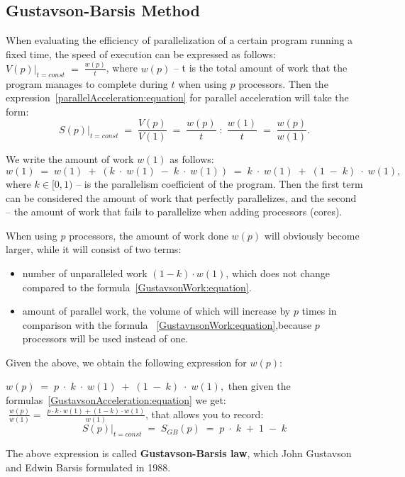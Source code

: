 { %
	\subsection{Gustavson-Barsis Method}
	\par When evaluating the efficiency of parallelization of a certain program running a fixed time, the speed of execution can be expressed as follows: $\left.V(p)\right|_{t=const}\;=\;\frac {w(p)}t$, where $w(p)$ – t is the total amount of work that the program manages to complete during $ t $ when using $p$ processors. Then the expression~\eqref{parallelAcceleration:equation} for parallel acceleration will take the form:
	\begin{equation}
		\label{GustavsonAcceleration:equation}
		\left.S(p)\right|_{t=const}\;=\;\frac{V(p)}{V(1)}\;=\;\frac{w(p)}t\;:\;\frac{w(1)}t\;=\;\frac{w(p)}{w(1)}.
	\end{equation}
	\par We write the amount of work $w (1)$ as follows:
	\begin{equation}
		\label{GustavsonWork:equation}
		w(1)\;=\;w(1)\;+\;(k\;\cdot\;w(1)\;-\;k\;\cdot\;w(1))\;=\;k\;\cdot\;w(1)\;+\;(1\;-\;k)\;\cdot\;w(1),
	\end{equation}
	where $k\in\lbrack0,1)$ – is the parallelism coefficient of the program. Then the first term can be considered the amount of work that perfectly parallelizes, and the second – the amount of work that fails to parallelize when adding processors (cores).
	\par When using $p$ processors, the amount of work done $w(p)$ will obviously become larger, while it will consist of two terms:
	\begin{itemize}
		\item number of unparalleled work $(1-k)\cdot w(1)$, which does not change compared to the formula~\eqref{GustavsonWork:equation}.
		\item amount of parallel work, the volume of which will increase by $p$ times in comparison with the formula ~\eqref{GustavnsonWork:equation},because $p$ processors will be used instead of one.
	\end{itemize}
	\par Given the above, we obtain the following expression for $w(p)$:
	\par$w(p)\;=\;p\;\cdot\;k\;\cdot\;w(1)\;+\;(1\;-\;k)\;\cdot\;w(1),$ then given the formulas~\eqref{GustavsonAcceleration:equation} we get: $\;\frac{w(p)}{w(1)}=\;\frac{p\cdot k\cdot w(1)+(1-k)\cdot w(1)}{w(1)}$, that allows you to record:
	\begin{equation}
		\left.S(p)\right|_{t=const}\;=\;S_{GB}(p)\;=\;p\;\cdot\;k\;+\;1\;-\;k
	\end{equation}
	\par The above expression is called \textbf {Gustavson-Barsis law}, which John Gustavson and Edwin Barsis formulated in 1988.
	\par
}